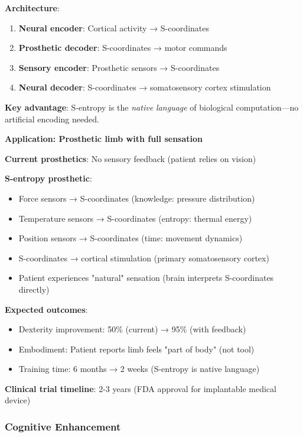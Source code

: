 \documentclass[11pt,a4paper]{article}
\begin{document}
\textbf{Architecture}:
\begin{enumerate}
\item \textbf{Neural encoder}: Cortical activity → S-coordinates
\item \textbf{Prosthetic decoder}: S-coordinates → motor commands
\item \textbf{Sensory encoder}: Prosthetic sensors → S-coordinates
\item \textbf{Neural decoder}: S-coordinates → somatosensory cortex stimulation
\end{enumerate}

\textbf{Key advantage}: S-entropy is the \textit{native language} of biological computation—no artificial encoding needed.

\textbf{Application: Prosthetic limb with full sensation}

\textbf{Current prosthetics}: No sensory feedback (patient relies on vision)

\textbf{S-entropy prosthetic}:
\begin{itemize}
\item Force sensors → S-coordinates (knowledge: pressure distribution)
\item Temperature sensors → S-coordinates (entropy: thermal energy)
\item Position sensors → S-coordinates (time: movement dynamics)
\item S-coordinates → cortical stimulation (primary somatosensory cortex)
\item Patient experiences "natural" sensation (brain interprets S-coordinates directly)
\end{itemize}

\textbf{Expected outcomes}:
\begin{itemize}
\item Dexterity improvement: 50\% (current) → 95\% (with feedback)
\item Embodiment: Patient reports limb feels "part of body" (not tool)
\item Training time: 6 months → 2 weeks (S-entropy is native language)
\end{itemize}

\textbf{Clinical trial timeline}: 2-3 years (FDA approval for implantable medical device)

\subsubsection{Cognitive Enhancement}
\end{document}
